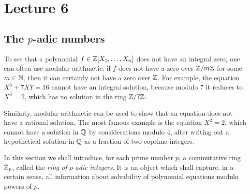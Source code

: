\documentclass[12pt, leqno, british]{amsart}
\author{Nicolas Daans}
\begin{document}
\section{Lecture 6}

\subsection{The $p$-adic numbers}
To see that a polynomial $f \in \mathbb Z[X_1, \ldots, X_n]$ does not have an integral zero, one can often use modular arithmetic: if $f$ does not have a zero over $\mathbb Z/m\mathbb Z$ for some $m \in \mathbb N$, then it can certainly not have a zero over $\mathbb Z$.
For example, the equation $X^3 + 7XY = 16$ cannot have an integral solution, because modulo $7$ it reduces to $X^3 = 2$, which has no solution in the ring $\mathbb Z/7\mathbb Z$.

Similarly, modular arithmetic can be used to show that an equation does not have a rational solution.
The most famous example is the equation $X^2 = 2$, which cannot have a solution in $\mathbb Q$ by considerations modulo $4$, after writing out a hypothetical solution in $\mathbb Q$ as a fraction of two coprime integers.

In this section we shall introduce, for each prime number $p$, a commutative ring $\mathbb Z_p$, called the \emph{ring of $p$-adic integers}.
It is an object which shall capture, in a certain sense, all information about solvability of polynomial equations modulo powers of $p$.
\end{document}
